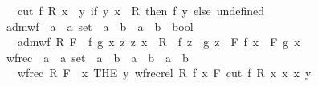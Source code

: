 \begin{isabellebody}
\ \ \ {\isachardoublequoteopen}cut\ f\ R\ x\ {\isacharequal}{\kern0pt}\ {\isacharparenleft}{\kern0pt}{\isasymlambda}y{\isachardot}{\kern0pt}\ if\ {\isacharparenleft}{\kern0pt}y{\isacharcomma}{\kern0pt}\ x{\isacharparenright}{\kern0pt}\ {\isasymin}\ R\ then\ f\ y\ else\ undefined{\isacharparenright}{\kern0pt}{\isachardoublequoteclose}\isanewline
\isanewline
{}\isamarkupfalse%
\ adm{\isacharunderscore}{\kern0pt}wf\ {\isacharcolon}{\kern0pt}{\isacharcolon}{\kern0pt}\ {\isachardoublequoteopen}{\isacharparenleft}{\kern0pt}{\isacharprime}{\kern0pt}a\ {\isasymtimes}\ {\isacharprime}{\kern0pt}a{\isacharparenright}{\kern0pt}\ set\ {\isasymRightarrow}\ {\isacharparenleft}{\kern0pt}{\isacharparenleft}{\kern0pt}{\isacharprime}{\kern0pt}a\ {\isasymRightarrow}\ {\isacharprime}{\kern0pt}b{\isacharparenright}{\kern0pt}\ {\isasymRightarrow}\ {\isacharparenleft}{\kern0pt}{\isacharprime}{\kern0pt}a\ {\isasymRightarrow}\ {\isacharprime}{\kern0pt}b{\isacharparenright}{\kern0pt}{\isacharparenright}{\kern0pt}\ {\isasymRightarrow}\ bool{\isachardoublequoteclose}\isanewline
\ \ \ {\isachardoublequoteopen}adm{\isacharunderscore}{\kern0pt}wf\ R\ F\ {\isasymlongleftrightarrow}\ {\isacharparenleft}{\kern0pt}{\isasymforall}f\ g\ x{\isachardot}{\kern0pt}\ {\isacharparenleft}{\kern0pt}{\isasymforall}z{\isachardot}{\kern0pt}\ {\isacharparenleft}{\kern0pt}z{\isacharcomma}{\kern0pt}\ x{\isacharparenright}{\kern0pt}\ {\isasymin}\ R\ {\isasymlongrightarrow}\ f\ z\ {\isacharequal}{\kern0pt}\ g\ z{\isacharparenright}{\kern0pt}\ {\isasymlongrightarrow}\ F\ f\ x\ {\isacharequal}{\kern0pt}\ F\ g\ x{\isacharparenright}{\kern0pt}{\isachardoublequoteclose}\isanewline
\isanewline
{}\isamarkupfalse%
\ wfrec\ {\isacharcolon}{\kern0pt}{\isacharcolon}{\kern0pt}\ {\isachardoublequoteopen}{\isacharparenleft}{\kern0pt}{\isacharprime}{\kern0pt}a\ {\isasymtimes}\ {\isacharprime}{\kern0pt}a{\isacharparenright}{\kern0pt}\ set\ {\isasymRightarrow}\ {\isacharparenleft}{\kern0pt}{\isacharparenleft}{\kern0pt}{\isacharprime}{\kern0pt}a\ {\isasymRightarrow}\ {\isacharprime}{\kern0pt}b{\isacharparenright}{\kern0pt}\ {\isasymRightarrow}\ {\isacharparenleft}{\kern0pt}{\isacharprime}{\kern0pt}a\ {\isasymRightarrow}\ {\isacharprime}{\kern0pt}b{\isacharparenright}{\kern0pt}{\isacharparenright}{\kern0pt}\ {\isasymRightarrow}\ {\isacharparenleft}{\kern0pt}{\isacharprime}{\kern0pt}a\ {\isasymRightarrow}\ {\isacharprime}{\kern0pt}b{\isacharparenright}{\kern0pt}{\isachardoublequoteclose}\isanewline
\ \ \ {\isachardoublequoteopen}wfrec\ R\ F\ {\isacharequal}{\kern0pt}\ {\isacharparenleft}{\kern0pt}{\isasymlambda}x{\isachardot}{\kern0pt}\ THE\ y{\isachardot}{\kern0pt}\ wfrec{\isacharunderscore}{\kern0pt}rel\ R\ {\isacharparenleft}{\kern0pt}{\isasymlambda}f\ x{\isachardot}{\kern0pt}\ F\ {\isacharparenleft}{\kern0pt}cut\ f\ R\ x{\isacharparenright}{\kern0pt}\ x{\isacharparenright}{\kern0pt}\ x\ y{\isacharparenright}{\kern0pt}{\isachardoublequoteclose}\isanewline

\end{isabellebody}
